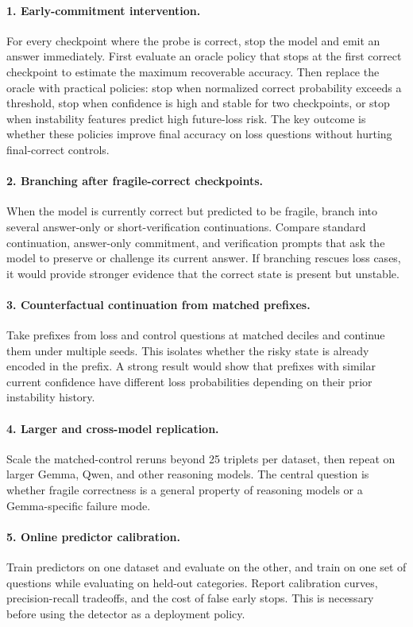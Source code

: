 \documentclass[11pt]{article}
\begin{document}
\paragraph{1. Early-commitment intervention.}
For every checkpoint where the probe is correct, stop the model and emit an
answer immediately. First evaluate an oracle policy that stops at the first
correct checkpoint to estimate the maximum recoverable accuracy. Then replace
the oracle with practical policies: stop when normalized correct probability
exceeds a threshold, stop when confidence is high and stable for two
checkpoints, or stop when instability features predict high future-loss risk.
The key outcome is whether these policies improve final accuracy on loss
questions without hurting final-correct controls.

\paragraph{2. Branching after fragile-correct checkpoints.}
When the model is currently correct but predicted to be fragile, branch into
several answer-only or short-verification continuations. Compare standard
continuation, answer-only commitment, and verification prompts that ask the
model to preserve or challenge its current answer. If branching rescues loss
cases, it would provide stronger evidence that the correct state is present
but unstable.

\paragraph{3. Counterfactual continuation from matched prefixes.}
Take prefixes from loss and control questions at matched deciles and continue
them under multiple seeds. This isolates whether the risky state is already
encoded in the prefix. A strong result would show that prefixes with similar
current confidence have different loss probabilities depending on their
prior instability history.

\paragraph{4. Larger and cross-model replication.}
Scale the matched-control reruns beyond 25 triplets per dataset, then repeat
on larger Gemma, Qwen, and other reasoning models. The central question is
whether fragile correctness is a general property of reasoning models or a
Gemma-specific failure mode.

\paragraph{5. Online predictor calibration.}
Train predictors on one dataset and evaluate on the other, and train on one
set of questions while evaluating on held-out categories. Report calibration
curves, precision-recall tradeoffs, and the cost of false early stops. This
is necessary before using the detector as a deployment policy.
\end{document}
